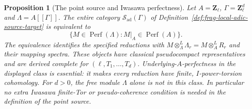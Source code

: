 \documentclass[11pt]{article}
\newtheorem{proposition}[theorem]{Proposition}
\theoremstyle{definition}
\theoremstyle{remark}
\begin{document}
\begin{proposition}[The point source and Iwasawa perfectness]
\label{prop:frag-point-source-iwasawa-admissibility}
Let $A=\mathbf Z_\ell$, $\Gamma=\mathbf Z_\ell^d$ and
$\Lambda=A[[\Gamma]]$.  The entire category
$\mathcal S_{\mathrm{ad}}(\Gamma)$ of
Definition~\ref{def:frag-local-adic-source-target} is equivalent to
\[
 \{M\in\operatorname{Perf}(\Lambda):
                   M|_A\in\operatorname{Perf}(A)\}.
\]
The equivalence identifies the specified reductions with
$M\otimes_\Lambda^L\Lambda_r=M\otimes_A^LR_r$ and their mapping
spectra.  These objects have classical pseudocompact representatives
and are derived complete for $(\ell,T_1,\ldots,T_d)$.
Underlying-$A$-perfectness in the displayed class is essential:
it makes every reduction have finite, $I$-power-torsion cohomology.
For $d>0$, the free module $\Lambda$ alone is not in this class.
In particular no extra Iwasawa finite-Tor or pseudo-coherence
condition is needed in the definition of the point source.
\end{proposition}
\end{document}
